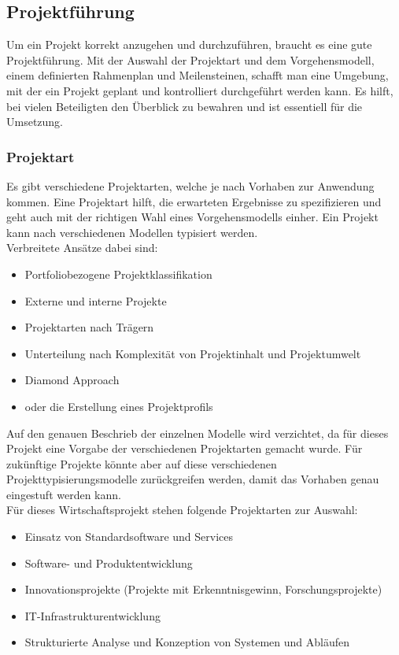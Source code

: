 \documentclass[a4paper, table]{article}
\begin{document}
\subsection{Projektführung}\label{project-management}
Um ein Projekt korrekt anzugehen und durchzuführen, braucht es eine gute Projektführung.
Mit der Auswahl der Projektart und dem Vorgehensmodell, einem definierten Rahmenplan und Meilensteinen, schafft man eine Umgebung, mit der ein Projekt geplant und kontrolliert durchgeführt werden kann. 
Es hilft, bei vielen Beteiligten den Überblick zu bewahren und ist essentiell für die Umsetzung.

\subsubsection{Projektart}
Es gibt verschiedene Projektarten, welche je nach Vorhaben zur Anwendung kommen. 
Eine Projektart hilft, die erwarteten Ergebnisse zu spezifizieren und geht auch mit der richtigen Wahl eines Vorgehensmodells einher.
Ein Projekt kann nach verschiedenen Modellen typisiert werden.\\
Verbreitete Ansätze dabei sind:
\begin{itemize}
    \item Portfoliobezogene Projektklassifikation
    \item Externe und interne Projekte
    \item Projektarten nach Trägern
    \item Unterteilung nach Komplexität von Projektinhalt und Projektumwelt
    \item Diamond Approach
    \item oder die Erstellung eines Projektprofils\autocite{claus_husselmann_zielgerichtete_nodate} %
\end{itemize}
Auf den genauen Beschrieb der einzelnen Modelle wird verzichtet, da für dieses Projekt eine Vorgabe der verschiedenen Projektarten gemacht wurde. 
Für zukünftige Projekte könnte aber auf diese verschiedenen Projekttypisierungsmodelle zurückgreifen werden, damit das Vorhaben genau eingestuft werden kann.\\
Für dieses Wirtschaftsprojekt stehen folgende Projektarten zur Auswahl:
\begin{itemize}
    \item Einsatz von Standardsoftware und Services
    \item Software- und Produktentwicklung
    \item Innovationsprojekte (Projekte mit Erkenntnisgewinn, Forschungsprojekte)
    \item IT-Infrastrukturentwicklung
    \item Strukturierte Analyse und Konzeption von Systemen und Abläufen \autocite{oliver_gilbert_wipro_2022} %
\end{itemize}
\end{document}
